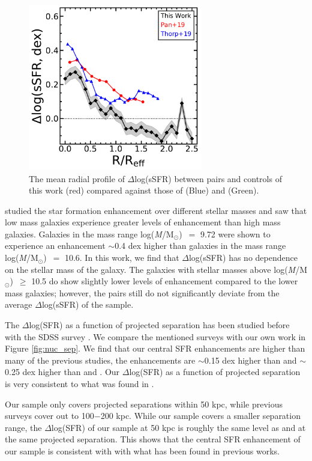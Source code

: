 \documentclass[iop,revtex4,twocolumn,apj,numberedappendix,appendixfloats]{emulateapj}
\newcommand{\logm}{log({\it M}/M$_{\odot}$)}
\begin{document}
\begin{figure}
\centering
\includegraphics[width=3in]{fig/prof_comp.pdf}
\caption[]{The mean radial profile of $\Delta$log(sSFR) between pairs and controls of this work (red) compared against those of \citet{Pan:2019} (Blue) and \citet{Thorp:2019} (Green).}
\label{fig:prof_comp}
\end{figure}

\citet{Li:2008} studied the star formation enhancement over different stellar masses and saw that low mass galaxies experience greater levels of enhancement than high mass galaxies.  Galaxies in the mass range \logm\ $=$ 9.72 were shown to experience an enhancement $\sim$0.4 dex higher than galaxies in the mass range \logm\ $=$ 10.6. In this work, we find that $\Delta$log(sSFR) has no dependence on the stellar mass of the galaxy. The galaxies with stellar masses above \logm\ $\ge$ 10.5 do show slightly lower levels of enhancement compared to the lower mass galaxies; however, the pairs still do not significantly deviate from the average $\Delta$log(sSFR) of the sample.

The $\Delta$log(SFR) as a function of projected separation has been studied before with the SDSS survey \citep{Ellison:2008, Patton:2013, Scudder:2012, Bustamante:2020}. We compare the mentioned surveys with our own work in Figure \ref{fig:nuc_sep}. We find that our central SFR enhancements are higher than many of the previous studies, the enhancements are $\sim$0.15 dex higher than \citet{Scudder:2012} and $\sim$0.25 dex higher than \citet{Ellison:2008} and \citet{Bustamante:2020}. Our $\Delta$log(SFR) as a function of projected separation is very consistent to what was found in \citet{Patton:2013}.

Our sample only covers projected separations within 50 kpc, while previous surveys cover out to 100$-$200 kpc. While our sample covers a smaller separation range, the $\Delta$log(SFR) of our sample at 50 kpc is roughly the same level as \citet{Scudder:2012} and \citet{Patton:2013} at the same projected separation. This shows that the central SFR enhancement of our sample is consistent with with what has been found in previous works. 
\end{document}
